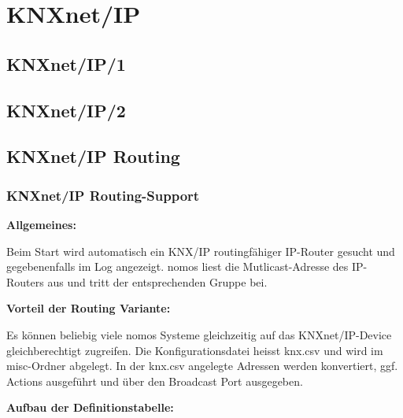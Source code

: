 \documentclass[letterpaper,10pt,english]{sphinxmanual}
\begin{document}
\section{KNXnet/IP}
\label{chapter_5:knxnet-ip}

\subsection{KNXnet/IP/1}
\label{chapter_5:knxnet-ip-1}

\subsection{KNXnet/IP/2}
\label{chapter_5:knxnet-ip-2}

\subsection{KNXnet/IP Routing}
\label{chapter_5:knxnet-ip-routing}

\subsubsection{KNXnet/IP Routing-Support}
\label{chapter_5:knxnet-ip-routing-support}
\begin{DUlineblock}{0em}
\item[] \textbf{Allgemeines:}
\item[] Beim Start wird automatisch ein KNX/IP routingfähiger IP-Router gesucht und gegebenenfalls im Log angezeigt. nomos liest die Mutlicast-Adresse des IP-Routers aus und tritt der entsprechenden Gruppe bei.
\end{DUlineblock}

\begin{DUlineblock}{0em}
\item[] \textbf{Vorteil der Routing Variante:}
\item[] Es können beliebig viele nomos Systeme gleichzeitig auf das KNXnet/IP-Device gleichberechtigt zugreifen. Die Konfigurationsdatei heisst knx.csv und wird im misc-Ordner abgelegt. In der knx.csv angelegte Adressen werden konvertiert, ggf. Actions ausgeführt und über den Broadcast Port ausgegeben.
\end{DUlineblock}

\begin{DUlineblock}{0em}
\item[] 
\item[] \textbf{Aufbau der Definitionstabelle:}
\end{DUlineblock}
\end{document}
